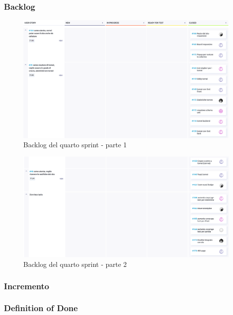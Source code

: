 \documentclass{article}
\begin{document}
\subsubsection{Backlog}
\begin{figure}[H]
    \centering
    \includegraphics[width=1\textwidth]{backlog4_1}
    \caption{Backlog del quarto sprint - parte 1}
    \label{fig:backlog4_1}
\end{figure}

\begin{figure}[H]
    \centering
    \includegraphics[width=1\textwidth]{backlog4_2}
    \caption{Backlog del quarto sprint - parte 2}
    \label{fig:backlog4_2}
\end{figure}

\subsubsection{Incremento}

\subsubsection{Definition of Done}
\end{document}
